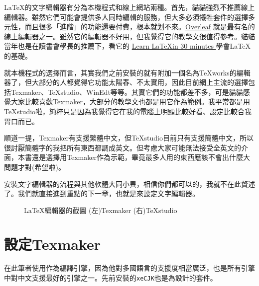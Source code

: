\documentclass{../indiv}
\begin{document}
	\LaTeX 的文字編輯器有分為本機程式和線上網站兩種。首先，貓貓強烈不推薦線上編輯器。雖然它們可能會提供多人同時編輯的服務，但大多必須犧牲套件的選擇多元性，而且很多「進階」的功能還要付費，根本就划不來。\href{https://www.overleaf.com/}{Overleaf} 就是最有名的線上編輯器之一。雖然它的編輯器不好用，但我覺得它的教學文很值得參考。貓貓當年也是在讀書會學長的推薦下，看它的 \href{https://www.overleaf.com/learn/latex/Learn_LaTeX_in_30_minutes}{Learn \LaTeX in 30 minutes
	}學會\LaTeX 的基礎。
	
	就本機程式的選擇而言，其實我們之前安裝的就有附加一個名為TeXworks的編輯器了，但大部分的人都覺得它功能太陽春、不太實用，因此目前網上主流的選擇包括Texmaker、TeXstudio、WinEdt等等。其實它們的功能都差不多，可是貓貓感覺大家比較喜歡Texmaker，大部分的教學文也都是用它作為範例。我平常都是用TeXstudio啦，純粹只是因為我覺得它在我的電腦上明顯比較好看、設定比較合我胃口而已。
	
	順道一提，Texmaker有支援繁體中文，但TeXstudio目前只有支援簡體中文，所以很討厭簡體字的我把所有東西都調成英文。但考慮大家可能無法接受全英文的介面，本書還是選擇用Texmaker作為示範，畢竟最多人用的東西應該不會出什麼大問題才對(希望啦)。
	
	安裝文字編輯器的流程與其他軟體大同小異，相信你們都可以的，我就不在此贅述了。我們就直接進到重點的下一章，也就是來設定文字編輯器。
	
	\begin{figure}[H]
		\centering
		\caption{\LaTeX 編輯器的截圖 (左)Texmaker (右)TeXstudio}
		\label{fig: LaTeX Editor Screenshots}
	\end{figure}
	\pagebreak
	\section{設定Texmaker}
	在此筆者使用作為編譯引擎，因為他對多國語言的支援度相當廣泛，也是所有引擎中對中文支援最好的引擎之一。先前安裝的\texttt{xeCJK}也是為設計的套件。
\end{document}
